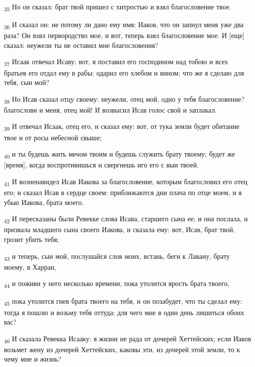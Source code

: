\begin{tcolorbox}
\textsubscript{35} Но он сказал: брат твой пришел с хитростью и взял благословение твое.
\end{tcolorbox}
\begin{tcolorbox}
\textsubscript{36} И сказал он: не потому ли дано ему имя: Иаков, что он запнул меня уже два раза? Он взял первородство мое, и вот, теперь взял благословение мое. И [еще] сказал: неужели ты не оставил мне благословения?
\end{tcolorbox}
\begin{tcolorbox}
\textsubscript{37} Исаак отвечал Исаву: вот, я поставил его господином над тобою и всех братьев его отдал ему в рабы; одарил его хлебом и вином; что же я сделаю для тебя, сын мой?
\end{tcolorbox}
\begin{tcolorbox}
\textsubscript{38} Но Исав сказал отцу своему: неужели, отец мой, одно у тебя благословение? благослови и меня, отец мой! И возвысил Исав голос свой и заплакал.
\end{tcolorbox}
\begin{tcolorbox}
\textsubscript{39} И отвечал Исаак, отец его, и сказал ему: вот, от тука земли будет обитание твое и от росы небесной свыше;
\end{tcolorbox}
\begin{tcolorbox}
\textsubscript{40} и ты будешь жить мечом твоим и будешь служить брату твоему; будет же [время], когда воспротивишься и свергнешь иго его с выи твоей.
\end{tcolorbox}
\begin{tcolorbox}
\textsubscript{41} И возненавидел Исав Иакова за благословение, которым благословил его отец его; и сказал Исав в сердце своем: приближаются дни плача по отце моем, и я убью Иакова, брата моего.
\end{tcolorbox}
\begin{tcolorbox}
\textsubscript{42} И пересказаны были Ревекке слова Исава, старшего сына ее; и она послала, и призвала младшего сына своего Иакова, и сказала ему: вот, Исав, брат твой, грозит убить тебя;
\end{tcolorbox}
\begin{tcolorbox}
\textsubscript{43} и теперь, сын мой, послушайся слов моих, встань, беги к Лавану, брату моему, в Харран,
\end{tcolorbox}
\begin{tcolorbox}
\textsubscript{44} и поживи у него несколько времени, пока утолится ярость брата твоего,
\end{tcolorbox}
\begin{tcolorbox}
\textsubscript{45} пока утолится гнев брата твоего на тебя, и он позабудет, что ты сделал ему: тогда я пошлю и возьму тебя оттуда; для чего мне в один день лишиться обоих вас?
\end{tcolorbox}
\begin{tcolorbox}
\textsubscript{46} И сказала Ревекка Исааку: я жизни не рада от дочерей Хеттейских; если Иаков возьмет жену из дочерей Хеттейских, каковы эти, из дочерей этой земли, то к чему мне и жизнь?
\end{tcolorbox}
